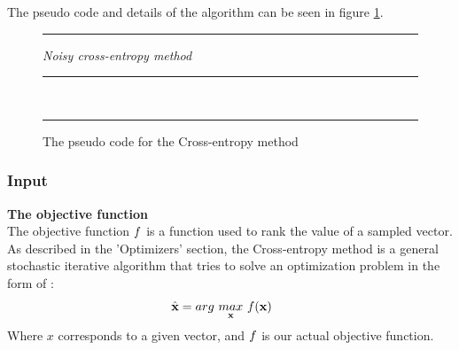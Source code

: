 The pseudo code and details of the algorithm can be seen in figure
\ref{fig:ceCode}.

\begin{figure}[H]
\hrule
\vspace{0.2cm}
{\centering  \textit{Noisy cross-entropy method}}
\vspace{0.2cm}
\hrule
\begin{algorithmic}
\\

\Loop
{}
\EndLoop
\end{algorithmic}
\hrule
\caption{The pseudo code for the Cross-entropy method \label{fig:ceCode}}
\end{figure}

\subsubsection{Input}

\textbf{The objective function \label{CEObjective}} \\
The objective function $f$ is a 
function used to rank the value of a sampled vector.
As described in the 'Optimizers' section, the Cross-entropy method is a general stochastic 
iterative algorithm that tries to solve an optimization problem in the form of \citep{scherrer2009}:
\begin{align}
\hat{\textbf{\individual }} &= 
arg \  \underset{\textbf{\individual }}{max} \  
\fitnessFunction (\textbf{\individual }) \ 
\end{align}
Where $x$ corresponds to a given vector, 
and $f$ is our actual objective function. 
\\

